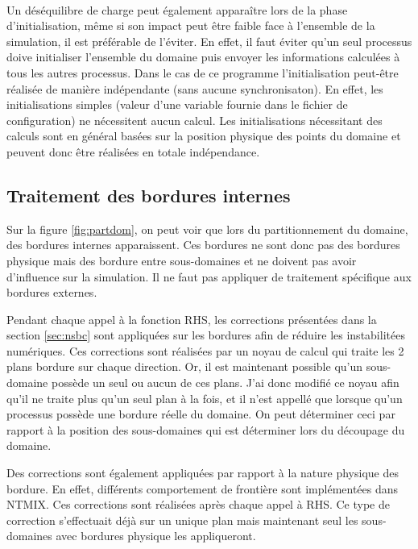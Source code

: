 \paragraph{}Un déséquilibre de charge peut également apparaître lors de la phase d'initialisation, même si son impact peut être faible face à l'ensemble de la simulation, il est préférable de l'éviter. En effet, il faut éviter qu'un seul processus doive initialiser l'ensemble du domaine puis envoyer les informations calculées à tous les autres processus. Dans le cas de ce programme l'initialisation peut-être réalisée de manière indépendante (sans aucune synchronisaton). En effet, les initialisations simples (valeur d'une variable fournie dans le fichier de configuration) ne nécessitent aucun calcul. Les initialisations nécessitant des calculs sont en général basées sur la position physique des points du domaine et peuvent donc être réalisées en totale indépendance.


\subsection{Traitement des bordures internes}
Sur la figure \ref{fig:partdom}, on peut voir que lors du partitionnement du domaine, des bordures internes apparaissent. Ces bordures ne sont donc pas des bordures physique mais des bordure entre sous-domaines et ne doivent pas avoir d'influence sur la simulation. Il ne faut pas appliquer de traitement spécifique aux bordures externes.


Pendant chaque appel à la fonction RHS, les corrections présentées dans la section \ref{sec:nsbc} sont appliquées sur les bordures afin de réduire les instabilitées numériques. Ces corrections sont réalisées par un noyau de calcul qui traite les 2 plans bordure sur chaque direction. Or, il est maintenant possible qu'un sous-domaine possède un seul ou aucun de ces plans. J'ai donc modifié ce noyau afin qu'il ne traite plus qu'un seul plan à la fois, et il n'est appellé que lorsque qu'un processus possède une bordure réelle du domaine. On peut déterminer ceci par rapport à la position des sous-domaines qui est déterminer lors du découpage du domaine.

Des corrections sont également appliquées par rapport à la nature physique des bordure. En effet, différents comportement de frontière sont implémentées dans NTMIX. Ces corrections sont réalisées après chaque appel à RHS. Ce type de correction s'effectuait déjà sur un unique plan mais maintenant seul les sous-domaines avec bordures physique les appliqueront.


